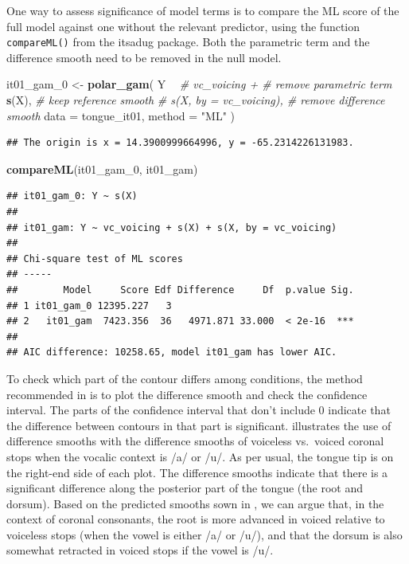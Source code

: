 \documentclass[12pt,]{article}
\newenvironment{Shaded}{\begin{snugshade}}{\end{snugshade}}
\newcommand{\CommentTok}[1]{\textcolor[rgb]{0.56,0.35,0.01}{\textit{#1}}}
\newcommand{\DataTypeTok}[1]{\textcolor[rgb]{0.13,0.29,0.53}{#1}}
\newcommand{\DecValTok}[1]{\textcolor[rgb]{0.00,0.00,0.81}{#1}}
\newcommand{\KeywordTok}[1]{\textcolor[rgb]{0.13,0.29,0.53}{\textbf{#1}}}
\newcommand{\NormalTok}[1]{#1}
\newcommand{\OperatorTok}[1]{\textcolor[rgb]{0.81,0.36,0.00}{\textbf{#1}}}
\newcommand{\StringTok}[1]{\textcolor[rgb]{0.31,0.60,0.02}{#1}}
\begin{document}
One way to assess significance of model terms is to compare the ML score
of the full model against one without the relevant predictor, using the
function \texttt{compareML()} from the itsadug package. Both the
parametric term and the difference smooth need to be removed in the null
model.

\begin{Shaded}
\begin{Highlighting}[]
\NormalTok{it01_gam_}\DecValTok{0}\NormalTok{ <-}\StringTok{ }\KeywordTok{polar_gam}\NormalTok{(}
\NormalTok{  Y }\OperatorTok{~}
\StringTok{    }\CommentTok{# vc_voicing +            # remove parametric term}
\StringTok{    }\KeywordTok{s}\NormalTok{(X),                     }\CommentTok{# keep reference smooth}
    \CommentTok{# s(X, by = vc_voicing),  # remove difference smooth}
  \DataTypeTok{data =}\NormalTok{ tongue_it01,}
  \DataTypeTok{method =} \StringTok{"ML"}
\NormalTok{)}
\end{Highlighting}
\end{Shaded}

\begin{verbatim}
## The origin is x = 14.3900999664996, y = -65.2314226131983.
\end{verbatim}

\begin{Shaded}
\begin{Highlighting}[]
\KeywordTok{compareML}\NormalTok{(it01_gam_}\DecValTok{0}\NormalTok{, it01_gam)}
\end{Highlighting}
\end{Shaded}

\begin{verbatim}
## it01_gam_0: Y ~ s(X)
## 
## it01_gam: Y ~ vc_voicing + s(X) + s(X, by = vc_voicing)
## 
## Chi-square test of ML scores
## -----
##        Model     Score Edf Difference     Df  p.value Sig.
## 1 it01_gam_0 12395.227   3                                
## 2   it01_gam  7423.356  36   4971.871 33.000  < 2e-16  ***
## 
## AIC difference: 10258.65, model it01_gam has lower AIC.
\end{verbatim}

To check which part of the contour differs among conditions, the method
recommended in \citet{soskuthy2017} is to plot the difference smooth and
check the confidence interval. The parts of the confidence interval that
don't include 0 indicate that the difference between contours in that
part is significant.  illustrates the use of
difference smooths with the difference smooths of voiceless vs.~voiced
coronal stops when the vocalic context is /a/ or /u/. As per usual, the
tongue tip is on the right-end side of each plot. The difference smooths
indicate that there is a significant difference along the posterior part
of the tongue (the root and dorsum). Based on the predicted smooths sown
in , we can argue that, in the context of coronal
consonants, the root is more advanced in voiced relative to voiceless
stops (when the vowel is either /a/ or /u/), and that the dorsum is also
somewhat retracted in voiced stops if the vowel is /u/.
\end{document}
